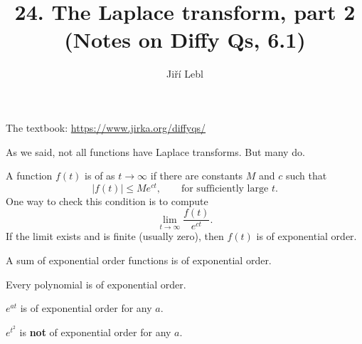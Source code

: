 \documentclass[10pt,aspectratio=169]{beamer}
\author{Ji\v{r}\'i Lebl}
\institute[OSU]{%
Oklahoma State University%
}
\title{24. The Laplace transform, part 2\\(Notes on Diffy Qs, 6.1)}
\date{}
\begin{document}
\begin{frame}
\titlepage


\begin{center}
The textbook: \url{https://www.jirka.org/diffyqs/}
\end{center}
\end{frame}

\begin{frame}
As we said, not all functions have Laplace transforms.  But many do.

\medskip
\pause

A function $f(t)$ is of
\emph{} as $t \to \infty$ if
there are constants $M$ and $c$ such that
\begin{equation*}
\lvert f(t) \rvert \leq M e^{ct} ,
\qquad
\text{for sufficiently large $t$} .
\end{equation*}
\pause
One way to check this condition is to compute
\begin{equation*}
\lim_{t\to \infty} \frac{f(t)}{e^{ct}} .
\end{equation*}
\pause
If the limit exists and is finite (usually zero), then $f(t)$ is of
exponential order.

\medskip
\pause

A sum of exponential order functions is of exponential order.

\pause
\medskip

Every polynomial is of exponential order.

\pause
\medskip

$e^{at}$ is of exponential order for any $a$.

\pause
\medskip

$e^{t^2}$ is \textbf{not} of exponential order for any $a$.

\end{frame}
\end{document}
